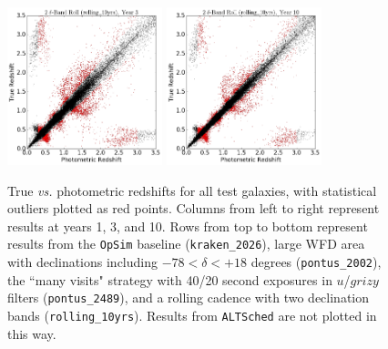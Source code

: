 \begin{figure}
\begin{center}
\includegraphics[width=4.5cm,trim={0cm 0cm 0cm 0cm},clip]{figures/tzpz_rolling10yrs_3.png}
\includegraphics[width=4.5cm,trim={0cm 0cm 0cm 0cm},clip]{figures/tzpz_rolling10yrs_10.png}
\caption{\small{True {\it vs.} photometric redshifts for all test galaxies, with statistical outliers plotted as red points. Columns from left to right represent results at years 1, 3, and 10. Rows from top to bottom represent results from the {\tt OpSim} baseline ({\tt kraken\_2026}), large WFD area with declinations including  $-78<\delta<+18$ degrees ({\tt pontus\_2002}), the ``many visits" strategy with 40/20 second exposures in $u$/$grizy$ filters ({\tt pontus\_2489}), and a rolling cadence with two declination bands ({\tt rolling\_10yrs}). Results from {\tt ALTSched} are not plotted in this way.} \label{fig:tzpz}}
\end{center}
\end{figure}

